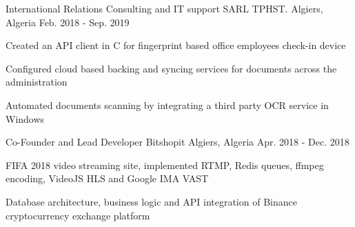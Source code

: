 \begin{cventries}
  \cventry
    {International Relations Consulting and IT support} %
    {SARL TPHST.} %
    {Algiers, Algeria} %
    {Feb. 2018 - Sep. 2019} %
    {
      \begin{cvitems} %
        \item {Created an API client in C for fingerprint based office employees check-in device}
        \item {Configured cloud based backing and syncing services for documents across the administration}
        \item {Automated documents scanning by integrating a third party OCR service in Windows}
      \end{cvitems}
    }

  \cventry
    {Co-Founder and Lead Developer} %
    {Bitshopit} %
    {Algiers, Algeria} %
    {Apr. 2018 - Dec. 2018} %
    {
      \begin{cvitems} %
        \item {FIFA 2018 video streaming site, implemented RTMP, Redis queues, ffmpeg encoding, VideoJS HLS and Google IMA VAST}
        \item {Database architecture, business logic and API integration of Binance cryptocurrency exchange platform}
      \end{cvitems}
    }

\end{cventries}
